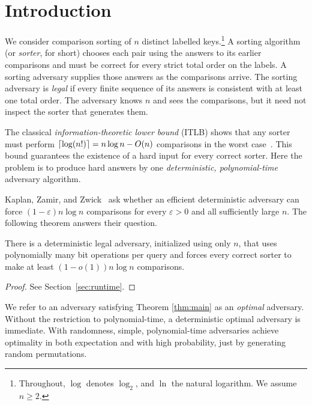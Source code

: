 \section{Introduction}\label{sec:classical}

We consider comparison sorting of $n$ distinct labelled keys.\footnote{Throughout,
$\log$ denotes $\log_2$, and $\ln$ the natural logarithm. We assume $n\ge2$.} A sorting algorithm (or \textit{sorter}, for short)
chooses each pair using the answers to its earlier comparisons and must be
correct for every strict total order on the labels. A sorting adversary
supplies those answers as the comparisons arrive. The sorting adversary is \emph{legal} if
every finite sequence of its answers is consistent with at least one total
order. The adversary knows $n$ and sees the comparisons, but it need not inspect
the sorter that generates them.

The classical \emph{information-theoretic lower bound} (ITLB) shows that any sorter must perform
$\left\lceil \log(n!)\right\rceil=n\log n-O(n)$ comparisons in the worst
case~\cite[Section~5.3.1]{knuth}. This bound guarantees the existence of a hard input for every correct
sorter. Here the problem is to produce hard answers by
one \emph{deterministic, polynomial-time} adversary algorithm.

Kaplan, Zamir, and Zwick~\cite[Section~7]{kzz-min} ask whether an efficient
deterministic adversary can force $(1-\varepsilon)n\log n$ comparisons
for every $\varepsilon>0$ and all sufficiently large $n$.
The following theorem answers their question.

\begin{theorem}\label{thm:main}
There is a deterministic legal adversary, initialized using only $n$, that
uses polynomially many bit operations per query and forces every correct
sorter to make at least $(1-o(1))n\log n$ comparisons.
\end{theorem}
\begin{proof}
See Section~\ref{sec:runtime}.
\end{proof}

We refer to an adversary satisfying Theorem \ref{thm:main} as an \textit{optimal} adversary.
Without the restriction to polynomial-time, a deterministic optimal
adversary is immediate. With randomness, simple, polynomial-time adversaries achieve
optimality in both expectation and with high probability, just by generating random permutations.

